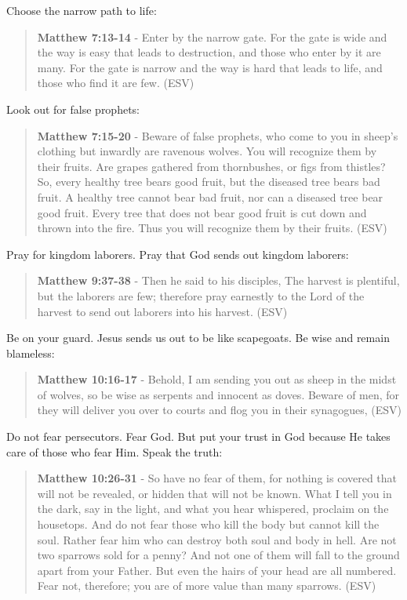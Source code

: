 \documentclass[11pt]{article}
\begin{document}
Choose the narrow path to life:

\begin{quote}
\textbf{Matthew 7:13-14} - Enter by the narrow gate. For the gate is wide and the way is easy that leads to destruction, and those who enter by it are many. For the gate is narrow and the way is hard that leads to life, and those who find it are few. (ESV)
\end{quote}

Look out for false prophets:

\begin{quote}
\textbf{Matthew 7:15-20} - Beware of false prophets, who come to you in sheep's clothing but inwardly are ravenous wolves. You will recognize them by their fruits. Are grapes gathered from thornbushes, or figs from thistles? So, every healthy tree bears good fruit, but the diseased tree bears bad fruit. A healthy tree cannot bear bad fruit, nor can a diseased tree bear good fruit. Every tree that does not bear good fruit is cut down and thrown into the fire. Thus you will recognize them by their fruits. (ESV)
\end{quote}

Pray for kingdom laborers. Pray that God sends out kingdom laborers:

\begin{quote}
\textbf{Matthew 9:37-38} - Then he said to his disciples, The harvest is plentiful, but the laborers are few; therefore pray earnestly to the Lord of the harvest to send out laborers into his harvest. (ESV)
\end{quote}

Be on your guard. Jesus sends us out to be like scapegoats. Be wise and remain blameless:

\begin{quote}
\textbf{Matthew 10:16-17} - Behold, I am sending you out as sheep in the midst of wolves, so be wise as serpents and innocent as doves. Beware of men, for they will deliver you over to courts and flog you in their synagogues, (ESV)
\end{quote}

Do not fear persecutors. Fear God. But put your trust in God because He takes care of those who fear Him. Speak the truth:

\begin{quote}
\textbf{Matthew 10:26-31} - So have no fear of them, for nothing is covered that will not be revealed, or hidden that will not be known. What I tell you in the dark, say in the light, and what you hear whispered, proclaim on the housetops. And do not fear those who kill the body but cannot kill the soul. Rather fear him who can destroy both soul and body in hell. Are not two sparrows sold for a penny? And not one of them will fall to the ground apart from your Father. But even the hairs of your head are all numbered. Fear not, therefore; you are of more value than many sparrows. (ESV)
\end{quote}
\end{document}
